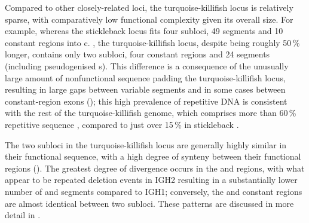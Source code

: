 Compared to other closely-related loci, the turquoise-killifish locus is relatively sparse, with comparatively low functional complexity given its overall size. For example, whereas the stickleback locus fits four subloci, 49 \vh segments and 10 constant regions into c.  \parencite{bao2010stickleback,gambondeza2011stickleback}, the turquoise-killifish locus, despite being roughly 50\,\% longer, contains only two subloci, four constant regions and 24 \vh segments (including pseudogenised \vh{}s). This difference is a consequence of the unusually large amount of nonfunctional sequence padding the turquoise-killifish locus, resulting in large gaps between variable segments and in some cases between constant-region exons (); this high prevalence of repetitive DNA is consistent with the rest of the turquoise-killifish genome, which comprises more than 60\,\% repetitive sequence \parencite{willemsen2019popgen}, compared to just over 15\,\% in stickleback \parencite{yuan2018repeats}.
	
The two subloci in the turquoise-killifish locus are generally highly similar in their functional sequence, with a high degree of synteny between their functional regions (). The greatest degree of divergence occurs in the \vh and \dh regions, with what appear to be repeated deletion events in IGH2 resulting in a substantially lower number of \vh and \dh segments compared to IGH1; conversely, the \jh and constant regions are almost identical between two subloci. These patterns are discussed in more detail in .
	
